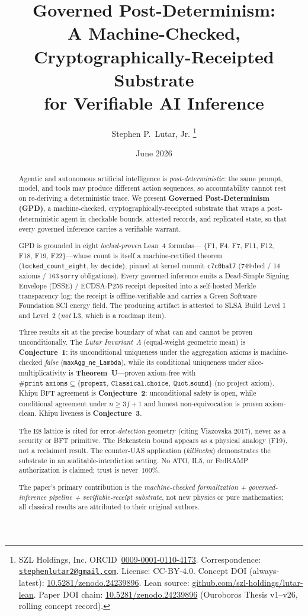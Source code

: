 \documentclass[11pt,letterpaper]{article}
\title{%
  \textbf{Governed Post-Determinism:}\\
  A Machine-Checked, Cryptographically-Receipted Substrate\\
  for Verifiable AI Inference%
}
\author{%
  Stephen P.\ Lutar, Jr.%
  \thanks{%
    SZL Holdings, Inc.
    ORCID~\href{https://orcid.org/0009-0001-0110-4173}{0009-0001-0110-4173}.
    Correspondence: \href{mailto:stephenlutar2@gmail.com}{\texttt{stephenlutar2@gmail.com}}.
    License: CC-BY-4.0.
    Concept DOI (always-latest):
    \href{https://doi.org/10.5281/zenodo.24239896}{10.5281/zenodo.24239896}.
    Lean source:
    \href{https://github.com/szl-holdings/lutar-lean}{github.com/szl-holdings/lutar-lean}.
    Paper DOI chain:
    \href{https://doi.org/10.5281/zenodo.24239896}{10.5281/zenodo.24239896}
    (Ouroboros Thesis v1--v26, rolling concept record).
  }
}
\date{June 2026}
\theoremstyle{definition}
\newcommand{\Lam}{\Lambda}
\newcommand{\Ucoreaxioms}%
  {\{\texttt{propext},\allowbreak\ \texttt{Classical.choice},\allowbreak\ \texttt{Quot.sound}\}}
\begin{document}
\maketitle

\begin{abstract}
Agentic and autonomous artificial intelligence is \emph{post-deterministic}:
the same prompt, model, and tools may produce different action sequences, so
accountability cannot rest on re-deriving a deterministic trace.  We present
\textbf{Governed Post-Determinism (GPD)}, a machine-checked, cryptographically-receipted
substrate that wraps a post-deterministic agent in checkable bounds, attested
records, and replicated state, so that every governed inference carries a
verifiable warrant.

GPD is grounded in eight \emph{locked-proven} Lean~4 formulas---
$\{$F1, F4, F7, F11, F12, F18, F19, F22$\}$---whose count is itself a
machine-certified theorem (\texttt{locked\_count\_eight}, by \texttt{decide}),
pinned at kernel commit \texttt{c7c0ba17} (749\,decl / 14\,axioms /
163\,\texttt{sorry} obligations).  Every governed inference emits a
Dead-Simple Signing Envelope (DSSE) / ECDSA-P256 receipt deposited into a
self-hosted Merkle transparency log; the receipt is offline-verifiable and
carries a Green Software Foundation SCI energy field.  The producing artifact
is attested to SLSA Build Level 1 and Level~2 (\emph{not} L3, which is a
roadmap item).

Three results sit at the precise boundary of what can and cannot be proven
unconditionally.  The \emph{Lutar Invariant}~$\Lam$ (equal-weight geometric
mean) is \textbf{Conjecture~1}: its unconditional uniqueness under the
aggregation axioms is machine-checked \emph{false}
(\texttt{maxAgg\_ne\_Lambda}), while its conditional uniqueness under
slice-multiplicativity is \textbf{Theorem~U}---proven axiom-free with
$\texttt{\#print axioms}\subseteq\Ucoreaxioms$ (no project axiom).
Khipu BFT agreement is \textbf{Conjecture~2}: unconditional safety is open,
while conditional agreement under $n\ge 3f+1$ and honest non-equivocation is
proven axiom-clean.  Khipu liveness is \textbf{Conjecture~3}.

The E8 lattice is cited for error-\emph{detection} geometry
(citing Viazovska 2017), never as a security or BFT primitive.  The
Bekenstein bound appears as a physical analogy (F19), not a reclaimed result.
The counter-UAS application (\emph{killinchu}) demonstrates the substrate
in an auditable-interdiction setting.  No ATO, IL5, or FedRAMP authorization
is claimed; trust is never~$100\%$.

The paper's primary contribution is the \emph{machine-checked formalization +
governed-inference pipeline + verifiable-receipt substrate}, not new physics
or pure mathematics; all classical results are attributed to their original
authors.
\end{abstract}
\end{document}
